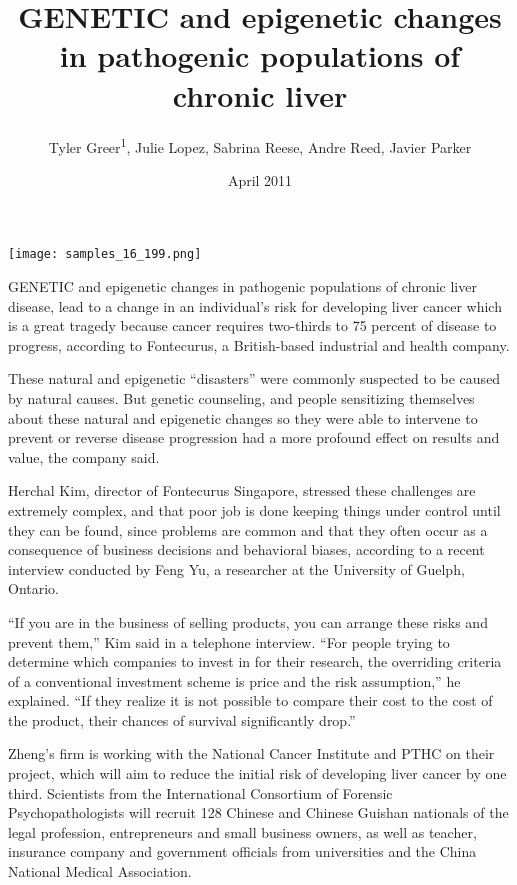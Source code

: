 \documentclass{article}
\title{GENETIC and epigenetic changes in pathogenic populations of chronic liver}
\author{Tyler Greer\textsuperscript{1},  Julie Lopez,  Sabrina Reese,  Andre Reed,  Javier Parker}
\affil{\textsuperscript{1}Australian Catholic University}
\date{April 2011}
\begin{document}
\maketitle

\begin{center}
\begin{minipage}{0.75\linewidth}
\texttt{[image: samples\_16\_199.png]}
\end{minipage}
\end{center}

GENETIC and epigenetic changes in pathogenic populations of chronic liver disease, lead to a change in an individual’s risk for developing liver cancer which is a great tragedy because cancer requires two-thirds to 75 percent of disease to progress, according to Fontecurus, a British-based industrial and health company.

These natural and epigenetic “disasters” were commonly suspected to be caused by natural causes. But genetic counseling, and people sensitizing themselves about these natural and epigenetic changes so they were able to intervene to prevent or reverse disease progression had a more profound effect on results and value, the company said.

Herchal Kim, director of Fontecurus Singapore, stressed these challenges are extremely complex, and that poor job is done keeping things under control until they can be found, since problems are common and that they often occur as a consequence of business decisions and behavioral biases, according to a recent interview conducted by Feng Yu, a researcher at the University of Guelph, Ontario.

“If you are in the business of selling products, you can arrange these risks and prevent them,” Kim said in a telephone interview. “For people trying to determine which companies to invest in for their research, the overriding criteria of a conventional investment scheme is price and the risk assumption,” he explained. “If they realize it is not possible to compare their cost to the cost of the product, their chances of survival significantly drop.”

Zheng’s firm is working with the National Cancer Institute and PTHC on their project, which will aim to reduce the initial risk of developing liver cancer by one third. Scientists from the International Consortium of Forensic Psychopathologists will recruit 128 Chinese and Chinese Guishan nationals of the legal profession, entrepreneurs and small business owners, as well as teacher, insurance company and government officials from universities and the China National Medical Association.
\end{document}
